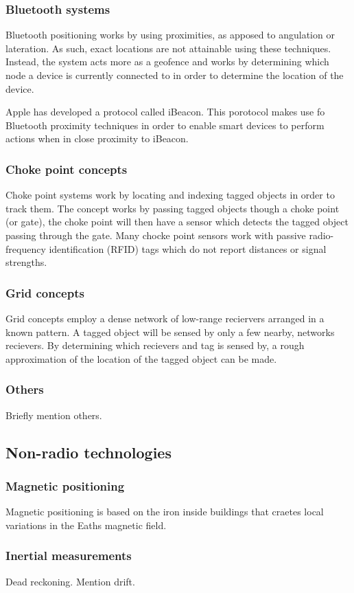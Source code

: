 \subsubsection{Bluetooth systems}
Bluetooth positioning works by using proximities, as apposed to angulation or lateration. As such, exact locations are not attainable using these techniques. Instead, the system acts more as a geofence and works by determining which node a device is currently connected to in order to determine the location of the device.

Apple has developed a protocol called iBeacon. This porotocol makes use fo Bluetooth proximity techniques in order to enable smart devices to perform actions when in close proximity to iBeacon.
\cite{_everything_????}

\subsubsection{Choke point concepts}
Choke point systems work by locating and indexing tagged objects in order to track them. The concept works by passing tagged objects though a choke point (or gate), the choke point will then have a sensor which detects the tagged object passing through the gate. Many chocke point sensors work with passive radio-frequency identification (RFID) tags which do not report distances or signal strengths.
\cite{reza_investigation_2008}

\subsubsection{Grid concepts}
Grid concepts employ a dense network of low-range reciervers arranged in a known pattern. A tagged object will be sensed by only a few nearby, networks recievers. By determining which recievers and tag is sensed by, a rough approximation of the location of the tagged object can be made.

\subsubsection{Others}
Briefly mention others.

\subsection{Non-radio technologies}

\subsubsection{Magnetic positioning}
Magnetic positioning is based on the iron inside buildings that craetes local variations in the Eaths magnetic field.

\subsubsection{Inertial measurements}
Dead reckoning. Mention drift.


